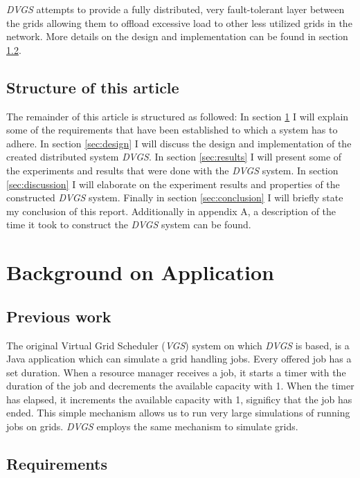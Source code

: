 \documentclass{article}
\begin{document}
\textit{DVGS} attempts to provide a fully distributed, very fault-tolerant layer between the grids allowing them to offload excessive load to other less utilized grids in the network. More details on the design and implementation can be found in section \ref{}.

\subsection{Structure of this article}
The remainder of this article is structured as followed: In section \ref{sec:background} I will explain some of the requirements that have been established to which a system has to adhere. In section \ref{sec:design} I will discuss the design and implementation of the created distributed system \textit{DVGS}. In section \ref{sec:results} I will present some of the experiments and results that were done with the \textit{DVGS} system. In section \ref{sec:discussion} I will elaborate on the experiment results and properties of the constructed \textit{DVGS} system. Finally in section \ref{sec:conclusion} I will briefly state my conclusion of this report. Additionally in appendix A, a description of the time it took to construct the \textit{DVGS} system can be found.


\section{Background on Application}
\label{sec:background}

\subsection{Previous work}
The original Virtual Grid Scheduler (\textit{VGS}) system on which \textit{DVGS} is based, is a Java application which can simulate a grid handling jobs. Every offered job has a set duration. When a resource manager receives a job, it starts a timer with the duration of the job and decrements the available capacity with 1. When the timer has elapsed, it increments the available capacity with 1, significy that the job has ended. This simple mechanism allows us to run very large simulations of running jobs on grids. \textit{DVGS} employs the same mechanism to simulate grids. 

\subsection{Requirements}
\end{document}
